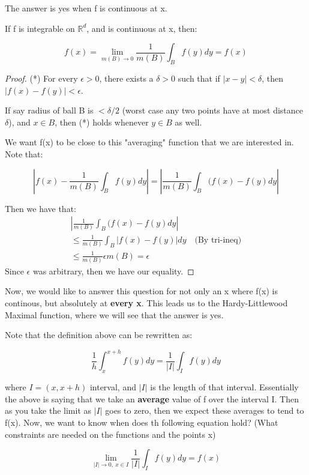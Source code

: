 \documentclass[class=article, crop=false]{standalone}
\begin{document}
		The answer is yes when f is continuous at x.
		\begin{lemma}
			If f is integrable on $\mathbb{R}^d$, and is continuous at x, then:

				$$f(x) = \lim_{m(B) \rightarrow 0} \frac{1}{m(B)} \int_B f(y) dy = f(x)$$
		\end{lemma}
		\begin{proof}
			(*) For every $\epsilon > 0$, there exists a $\delta > 0$ such that if $|x - y| < \delta$, then $|f(x) - f(y)| < \epsilon$. 

			If say radius of ball B is $< \delta / 2$ (worst case any two points have at most distance $\delta$), and $x \in B$, then (*) holds whenever $y \in B$ as well.

			We want f(x) to be close to this "averaging" function that we are interested in. Note that:

				$$|f(x) - \frac{1}{m(B)} \int_B f(y) dy | = |\frac{1}{m(B)} \int_B (f(x) - f(y) dy |$$

			Then we have that:
			\begin{align}
				|\frac{1}{m(B)} \int_B (f(x) - f(y) dy | \\
				\le \frac{1}{m(B)} \int_B |f(x) - f(y)| dy \quad \text{(By tri-ineq)} \\
				\le \frac{1}{m(B)} \epsilon m(B) = \epsilon
			\end{align}
			Since $\epsilon$ was arbitrary, then we have our equality.
		\end{proof}

		Now, we would like to answer this question for not only an x where f(x) is continous, but absolutely at \textbf{every x}. This leads us to the Hardy-Littlewood Maximal function, where we will see that the answer is yes.

		Note that the definition above can be rewritten as:

			$$\frac{1}{h} \int_x^{x+h} f(y) dy = \frac{1}{|I|} \int_I f(y) dy$$

		where $I = (x, x+h)$ interval, and $|I|$ is the length of that interval. Essentially the above is saying that we take an \textbf{average} value of f over the interval I. Then as you take the limit as $|I|$ goes to zero, then we expect these averages to tend to f(x). Now, we want to know when does th following equation hold? (What constraints are needed on the functions and the points x)

			$$\lim_{|I| \rightarrow 0,\ x \in I} \frac{1}{|I|} \int_I f(y) dy = f(x)$$
\end{document}
